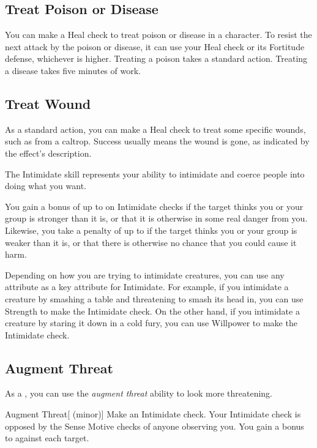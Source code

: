     \subsection{Treat Poison or Disease}
        You can make a Heal check to treat poison or disease in a character.
        To resist the next attack by the poison or disease, it can use your Heal check or its Fortitude defense, whichever is higher.
        Treating a poison takes a standard action. Treating a disease takes five minutes of work.

    \subsection{Treat Wound}
        As a standard action, you can make a Heal check to treat some specific wounds, such as from a caltrop. Success usually means the wound is gone, as indicated by the effect's description.

\newpage
{}
        The Intimidate skill represents your ability to intimidate and coerce people into doing what you want.

        You gain a bonus of up to  on Intimidate checks if the target thinks you or your group is stronger than it is, or that it is otherwise in some real danger from you. Likewise, you take a penalty of up to  if the target thinks you or your group is weaker than it is, or that there is otherwise no chance that you could cause it harm.

        Depending on how you are trying to intimidate creatures, you can use any attribute as a key attribute for Intimidate.
        For example, if you intimidate a creature by smashing a table and threatening to smash its head in, you can use Strength to make the Intimidate check.
        On the other hand, if you intimidate a creature by staring it down in a cold fury, you can use Willpower to make the Intimidate check.

    \subsection{Augment Threat}\label{Augment Threat}
        As a , you can use the \textit{augment threat} ability to look more threatening.
        \begin{ability}{Augment Threat}[ (minor)]
            Make an Intimidate check.
            Your Intimidate check is opposed by the Sense Motive checks of anyone observing you.
            \hit You gain a  bonus to  against each target.
        \end{ability}

